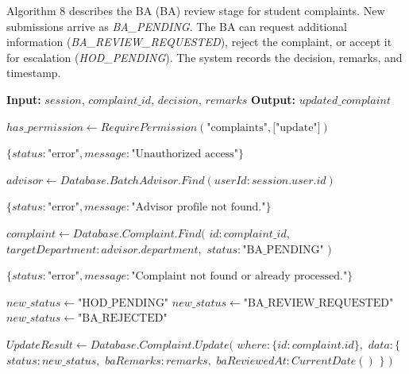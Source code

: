 Algorithm 8 describes the BA (BA) review stage for student complaints. New submissions arrive as \textit{BA\_PENDING}. The BA can request additional information (\textit{BA\_REVIEW\_REQUESTED}), reject the complaint, or accept it for escalation (\textit{HOD\_PENDING}). The system records the decision, remarks, and timestamp.

\begin{algorithm}[htbp]
\caption{BA Decision Workflow}
\begin{algorithmic}[1]

\State \textbf{Input:} $session$, $complaint\_id$, $decision$, $remarks$
\State \textbf{Output:} $updated\_complaint$


    \State {}
    \State $has\_permission \gets RequirePermission(\text{"complaints"}, \text{["update"]})$

        \State \Return $\{status: \text{"error"}, message: \text{"Unauthorized access"}\}$
    \EndIf

    \State {}
    \State $advisor \gets Database.BatchAdvisor.Find(userId: session.user.id)$

        \State \Return $\{status: \text{"error"}, message: \text{"Advisor profile not found."}\}$
    \EndIf

    \State {}
    \State $complaint \gets Database.Complaint.Find($
    \State \quad $id: complaint\_id,$
    \State \quad $targetDepartment: advisor.department,$
    \State \quad $status: \text{"BA\_PENDING"}$
    \State $)$

        \State \Return $\{status: \text{"error"}, message: \text{"Complaint not found or already processed."}\}$
    \EndIf

    \State {}
        \State $new\_status \gets \text{"HOD\_PENDING"}$
        \State $new\_status \gets \text{"BA\_REVIEW\_REQUESTED"}$
    \Else
        \State $new\_status \gets \text{"BA\_REJECTED"}$
    \EndIf

    \State {}
    \State $UpdateResult \gets Database.Complaint.Update($
    \State \quad $where: \{ id: complaint.id \},$
    \State \quad $data: \{$
    \State \quad \quad $status: new\_status,$
    \State \quad \quad $baRemarks: remarks,$
    \State \quad \quad $baReviewedAt: CurrentDate()$
    \State \quad $\}$
    \State $)$


\end{algorithmic}
\end{algorithm}
